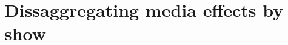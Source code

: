 \documentclass[10pt,landscape]{article}
\begin{document}
% 

% 

% 

% 

% 

% 

% 

%

%

\section{Dissaggregating media effects by show}

\clearpage


\clearpage


\clearpage

\printbibliography

\end{document}
